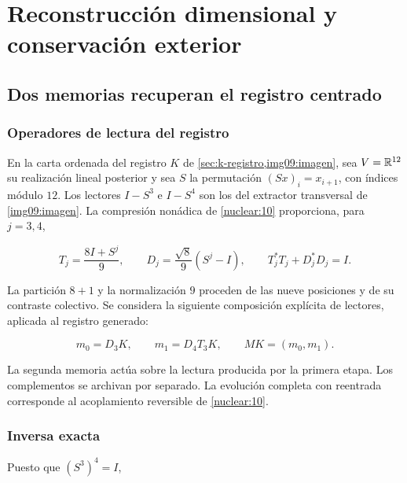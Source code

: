 \section{Reconstrucción dimensional y conservación exterior}
\label{nuclear:11}
\subsection{Dos memorias recuperan el registro centrado}

\subsubsection{Operadores de lectura del registro}

En la carta ordenada del registro \(K\) de
\cref{sec:k-registro,img09:imagen}, sea \(V=\mathbb R^{12}\) su
realización lineal posterior y sea \(S\) la permutación
\((Sx)_i=x_{i+1}\), con índices módulo \(12\).
Los lectores \(I-S^3\) e \(I-S^4\) son los del extractor transversal
de \cref{img09:imagen}.
La compresión nonádica de \cref{nuclear:10} proporciona,
para \(j=3,4\),



\begin{equation}
T_j=\frac{8I+S^j}{9},\qquad D_j=\frac{\sqrt8}{9}(S^j-I),
\qquad T_j^*T_j+D_j^*D_j=I.
\label{nuc11:eq:1}
\end{equation}



La partición \(8+1\) y la normalización \(9\) proceden de las nueve
posiciones y de su contraste colectivo.
Se considera la siguiente composición explícita de lectores,
aplicada al registro generado:



\begin{equation}
m_0=D_3K,\qquad m_1=D_4T_3K,
\qquad M K=(m_0,m_1).
\label{nuc11:eq:2}
\end{equation}



La segunda memoria actúa sobre la lectura producida por la primera
etapa. Los complementos se archivan por separado.
La evolución completa con reentrada corresponde al acoplamiento
reversible de \cref{nuclear:10}.

\subsubsection{Inversa exacta}

Puesto que \((S^3)^4=I\),



